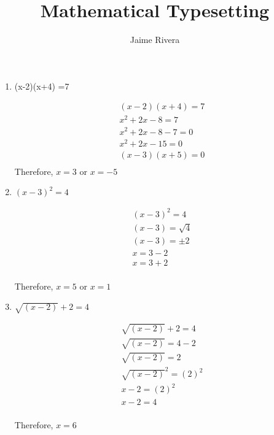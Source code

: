 \documentclass[11pt]{article}
\title{Mathematical Typesetting}
\author{Jaime Rivera}
\begin{document}
 
\maketitle


\begin{enumerate}

\item (x-2)(x+4) =7

\begin{align*}
    (x-2)(x+4) =7\\
    x^2 +2x -8 = 7\\
   x^2+2x-8-7=0\\
   x^2+2x-15=0\\
   (x-3)(x+5)=0\\
    \end{align*}
Therefore, $x = 3$ or $x = -5$


\item $(x-3)^2=4$

  \begin{align*}
 (x-3)^2=4\\
 (x-3)={\sqrt4}\\
 (x-3) = \pm2 \\
 x = 3 - 2\\
 x= 3 + 2\\
  \end{align*}
 
 Therefore, $x = 5$ or $x = 1$
 

\item $\sqrt{(x-2)} + 2 = 4$
 
  \begin{align*}
 \sqrt{(x-2)} + 2 = 4\\
 \sqrt{(x-2)} = 4 - 2\\
\sqrt{(x-2)} = 2\\
\sqrt{(x-2)}^2 = (2)^2\\
x-2 = (2)^2\\
x - 2 = 4\\
  \end{align*}
 
 Therefore, $x = 6$


\end{enumerate}

 
 
\end{document}
